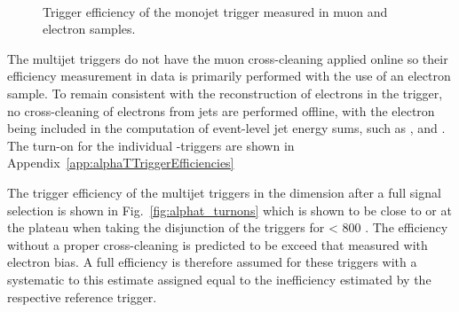 \begin{figure}[h!]
  \begin{center}
     ~~     
     \\
    \caption{Trigger efficiency of the monojet trigger measured in muon and electron samples.
          }
    \label{fig:monojet_turnons}
  \end{center} 
\end{figure}


The multijet triggers do not have the muon cross-cleaning applied online so their efficiency measurement in data 
is primarily performed with the use of an electron sample. To remain consistent with the 
reconstruction of electrons in the trigger, no cross-cleaning of electrons from jets 
are performed offline, with the electron being included in the computation of event-level jet energy sums, such as 
\scalht, \MHT and \alt. The turn-on for the individual \scalht-\alphat triggers are shown in Appendix~\ref{app:alphaTTriggerEfficiencies}

The trigger efficiency of the multijet triggers in the \mht dimension after a full signal selection 
is shown in Fig.~\ref{fig:alphat_turnons} which is shown to be close to or at the plateau when taking 
the disjunction of the triggers for \scalht < 800 \GeV. The efficiency without a proper cross-cleaning
is predicted to be exceed that measured with electron bias. A full efficiency is therefore assumed for 
these triggers with a systematic to this estimate assigned equal to the
inefficiency estimated by the respective reference trigger. 

